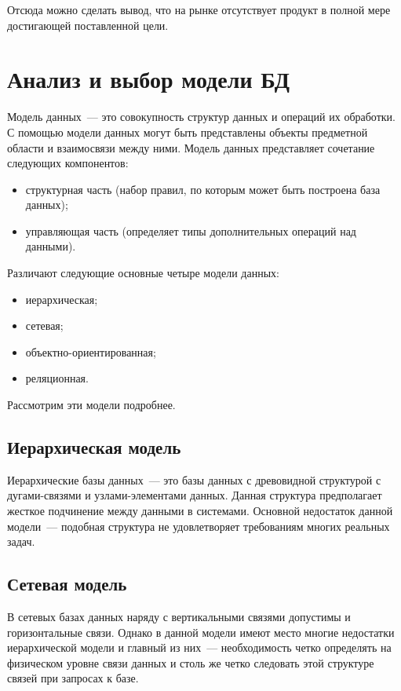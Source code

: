 Отсюда можно сделать вывод, что на рынке отсутствует продукт в полной мере достигающей поставленной цели.

\section{Анализ и выбор модели БД}%
\label{sec:analiz_i_vybor_modeli_bd}

Модель данных~--- это совокупность структур данных и операций их обработки. С помощью модели данных могут быть представлены объекты предметной области и взаимосвязи между ними. Модель данных представляет сочетание следующих компонентов:
\begin{itemize}
    \item структурная часть (набор правил, по которым может быть построена база данных);
    \item управляющая часть (определяет типы дополнительных операций над данными).
\end{itemize}

Различают следующие основные четыре модели данных:
\begin{itemize}
    \item иерархическая;
    \item сетевая;
    \item объектно-ориентированная;
    \item реляционная.
\end{itemize}

Рассмотрим эти модели подробнее.

\subsection{Иерархическая модель}%
\label{sub:ierarkhicheskaia_model_}

Иерархические базы данных~--- это базы данных с древовидной структурой с дугами-связями и узлами-элементами данных. Данная структура предполагает жесткое подчинение между данными в системами. Основной недостаток данной модели~--- подобная структура не удовлетворяет требованиям многих реальных задач.

\subsection{Сетевая модель}%
\label{sub:setevaia_model_}

В сетевых базах данных наряду с вертикальными связями допустимы и горизонтальные связи. Однако в данной модели имеют место многие недостатки иерархической модели и главный из них~--- необходимость четко определять на физическом уровне связи данных и столь же четко следовать этой структуре связей при запросах к базе.

